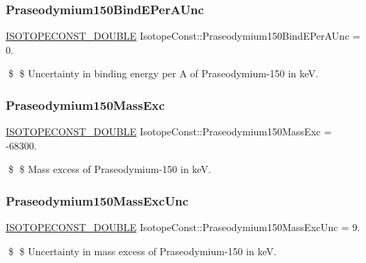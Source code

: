 \subsubsection{\texorpdfstring{Praseodymium150\+Bind\+E\+Per\+A\+Unc}{Praseodymium150BindEPerAUnc}}
{\footnotesize\ttfamily \mbox{\hyperlink{group___isotope_const-_macros_ga8f45a7272ce02c0b4c65c44636ed719a}{I\+S\+O\+T\+O\+P\+E\+C\+O\+N\+S\+T\+\_\+\+D\+O\+U\+B\+LE}} Isotope\+Const\+::\+Praseodymium150\+Bind\+E\+Per\+A\+Unc = 0.}

\$ \$ Uncertainty in binding energy per A of Praseodymium-\/150 in keV. \mbox{\label{group___isotope_const-_praseodymium-_pr150_ga0ad550b78d6650c1a92abb3ddd15448d}} 
\subsubsection{\texorpdfstring{Praseodymium150\+Mass\+Exc}{Praseodymium150MassExc}}
{\footnotesize\ttfamily \mbox{\hyperlink{group___isotope_const-_macros_ga8f45a7272ce02c0b4c65c44636ed719a}{I\+S\+O\+T\+O\+P\+E\+C\+O\+N\+S\+T\+\_\+\+D\+O\+U\+B\+LE}} Isotope\+Const\+::\+Praseodymium150\+Mass\+Exc = -\/68300.}

\$ \$ Mass excess of Praseodymium-\/150 in keV. \mbox{\label{group___isotope_const-_praseodymium-_pr150_ga77fdb0fb9fc40f316d586afd78ab5f36}} 
\subsubsection{\texorpdfstring{Praseodymium150\+Mass\+Exc\+Unc}{Praseodymium150MassExcUnc}}
{\footnotesize\ttfamily \mbox{\hyperlink{group___isotope_const-_macros_ga8f45a7272ce02c0b4c65c44636ed719a}{I\+S\+O\+T\+O\+P\+E\+C\+O\+N\+S\+T\+\_\+\+D\+O\+U\+B\+LE}} Isotope\+Const\+::\+Praseodymium150\+Mass\+Exc\+Unc = 9.}

\$ \$ Uncertainty in mass excess of Praseodymium-\/150 in keV. \mbox{\label{group___isotope_const-_praseodymium-_pr150_ga893313ccabf30a0709660ae0ca45c45b}} 
